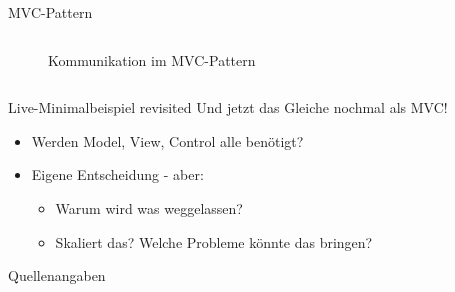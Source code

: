 \documentclass[aspectratio=169,t]{beamer}
\begin{document}
\begin{frame}{MVC-Pattern}
\begin{columns}
\begin{column}{0.5\textwidth}
\begin{figure}
                \caption{Kommunikation im MVC-Pattern \cite{MVC}}
            \end{figure}
        \end{column}
    \end{columns}
\end{frame}


\begin{frame}{Live-Minimalbeispiel revisited}
    Und jetzt das Gleiche nochmal als MVC!
    \begin{itemize}
        \item Werden Model, View, Control alle benötigt?
        \item Eigene Entscheidung - aber:
        \begin{itemize}
            \item Warum wird was weggelassen?
            \item Skaliert das? Welche Probleme könnte das bringen?
        \end{itemize}
    \end{itemize}
\end{frame}


\begin{frame}[allowframebreaks]{Quellenangaben}
\printbibliography
\end{frame}
\end{document}
